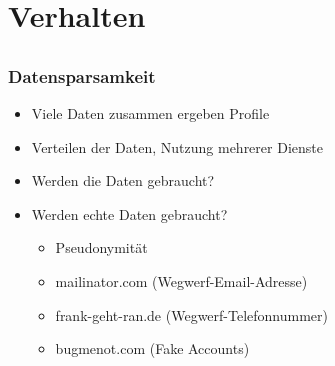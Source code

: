 \documentclass[12pt]{beamer}
\begin{document}
\section{Verhalten}
\subsection{}

\begin{frame}
    \frametitle{Datensparsamkeit}
    \begin{itemize}
        \item<2-> Viele Daten zusammen ergeben Profile
        \item<3-> Verteilen der Daten, Nutzung mehrerer Dienste
        \item<4-> Werden die Daten gebraucht?
        \item<5-> Werden echte Daten gebraucht?
          \begin{itemize}
            \item<6-> Pseudonymität
            \item<7-> mailinator.com (Wegwerf-Email-Adresse)
            \item<8-> frank-geht-ran.de (Wegwerf-Telefonnummer)
            \item<9-> bugmenot.com (Fake Accounts)
          \end{itemize}
    \end{itemize}
\end{frame}
\end{document}
